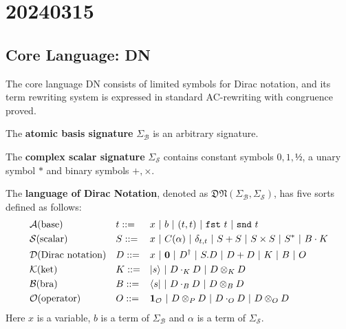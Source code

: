 \chapter{20240315}

\newcommand*{\unit}{\texttt{unit}}
\newcommand*{\utt}{\texttt{tt}}
\newcommand*{\fst}{\texttt{fst}}
\newcommand*{\snd}{\texttt{snd}}
\newcommand*{\reduce}{\ \triangleright\ }
\newcommand*{\reducefrom}{\ \triangleleft\ }

\newcommand*{\zeroK}[1]{\mathbf{0}_{\mathcal{K}(#1)}}
\newcommand*{\zeroB}[1]{\mathbf{0}_{\mathcal{B}(#1)}}
\newcommand*{\zeroO}[1]{\mathbf{0}_{\mathcal{O}(#1)}}


\section{Core Language: DN}

The core language DN consists of limited symbols for Dirac notation, and its term rewriting system is expressed in standard AC-rewriting with congruence proved.

\begin{definition} 
  The \textbf{atomic basis signature} $\Sigma_\mathcal{B}$ is an arbitrary signature.
\end{definition}

\begin{definition} 
  The \textbf{complex scalar signature} $\Sigma_\mathcal{S}$ contains constant symbols $0, 1, \text{½}$, a unary symbol $*$ and binary symbols $+, \times$.
\end{definition}

\begin{definition}
  The \textbf{language of Dirac Notation}, denoted as $\mathfrak{DN}(\Sigma_\mathcal{B}, \Sigma_\mathcal{S})$, has five sorts defined as follows:
  \begin{align*}
    & \mathcal{A} \textrm{(base)} && t ::= && x\ |\ b\ |\ (t, t)\ |\ \fst\ t\ |\ \snd\ t \\
    & \mathcal{S} \textrm{(scalar)} && S ::= && x\ |\ C(\alpha)\ |\ \delta_{t, t}\ |\ S + S\ |\ S \times S\ |\ S^*\ |\ B \cdot K \\
    & \mathcal{D} \textrm{(Dirac notation)} && D ::= && x\ |\ \mathbf{0}\ |\ D^\dagger\ |\ S.D\ |\ D + D\ |\ K\ |\ B\ |\ O \\
    & \mathcal{K} \textrm{(ket)} && K ::= && \ket{s}\ |\ D \cdot_{K} D\ |\ D \otimes_{K} D \\
    & \mathcal{B} \textrm{(bra)} && B ::= && \bra{s}\ |\ D \cdot_{B} D\ |\ D \otimes_{B} D \\
    & \mathcal{O} \textrm{(operator)} && O ::= && \mathbf{1}_\mathcal{O}\ |\ D \otimes_P D\ |\ D \cdot_{O} D\ |\ D \otimes_{O} D
  \end{align*}
  Here $x$ is a variable, $b$ is a term of $\Sigma_\mathcal{B}$ and $\alpha$ is a term of $\Sigma_\mathcal{S}$.

\end{definition}

